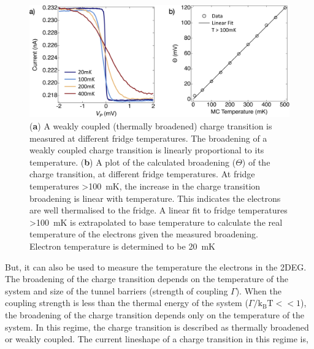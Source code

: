 \begin{figure}[!htb]
  \begin{center}
    \includegraphics[width=1.0\textwidth]{figures/ch1/crop_FiguresMaster.007.png}
    \caption[Calculating the electron temperature]{\label{fig:ch1/electron_temp} 
    (\textbf{a}) A weakly coupled (thermally broadened) charge transition is measured at different fridge temperatures. The broadening of a weakly coupled charge transition is linearly proportional to its temperature. (\textbf{b}) A plot of the calculated broadening ($\Theta$) of the charge transition, at different fridge temperatures. At fridge temperatures \qty{>100}{mK}, the increase in the charge transition broadening is linear with temperature. This indicates the electrons are well thermalised to the fridge. A linear fit to fridge temperatures \qty{>100}{mK} is extrapolated to base temperature to calculate the real temperature of the electrons given the measured broadening. Electron temperature is determined to be \qty{20}{mK}
      }
  \end{center}
\end{figure}



But, it can also be used to measure the temperature the electrons in the 2DEG. The broadening of the charge transition depends on the temperature of the system and size of the tunnel barriers (strength of coupling $\Gamma$). When the coupling strength is less than the thermal energy of the system ($\Gamma/\mathrm{k_BT} << 1$), the broadening of the charge transition depends only on the temperature of the system. In this regime, the charge transition is described as thermally broadened or weakly coupled. The current lineshape of a charge transition in this regime is,


